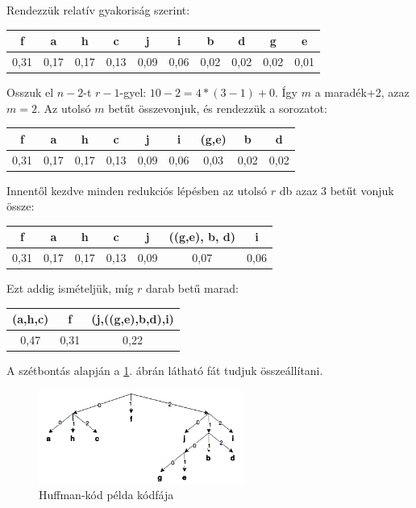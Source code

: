 \documentclass[margin=0px]{article}
\begin{document}
\begin{description}
					Rendezzük relatív gyakoriság szerint:
					
					\begin{tabular}{|c|c|c|c|c|c|c|c|c|c|}
						\hline f & a & h & c & j & i & b & d & g & e \\ 
						\hline 0,31 & 0,17 & 0,17 & 0,13 & 0,09 & 0,06 & 0,02 & 0,02 & 0,02 & 0,01 \\ 
						\hline 
					\end{tabular} 
					
					Osszuk el $n-2$-t $r-1$-gyel: $10-2 = 4*(3-1)+0$. Így $m$ a maradék+2, azaz $m=2$.
					Az utolsó $m$ betűt összevonjuk, és rendezzük a sorozatot:
					
					\begin{tabular}{|c|c|c|c|c|c|c|c|c|}
						\hline f & a & h & c & j & i & (g,e) & b & d  \\ 
						\hline 0,31 & 0,17 & 0,17 & 0,13 & 0,09 & 0,06 & 0,03 & 0,02 & 0,02 \\ 
						\hline 
					\end{tabular}
					
					Innentől kezdve minden redukciós lépésben az utolsó $r$ db azaz 3 betűt vonjuk össze:
					
					\begin{tabular}{|c|c|c|c|c|c|c|}
						\hline f & a & h & c & j & ((g,e), b, d) & i  \\ 
						\hline 0,31 & 0,17 & 0,17 & 0,13 & 0,09 & 0,07 & 0,06  \\ 
						\hline 
					\end{tabular}
					
					Ezt addig ismételjük, míg $r$ darab betű marad:
					
					\begin{tabular}{|c|c|c|}
						\hline (a,h,c) & f & (j,((g,e),b,d),i) \\ 
						\hline 0,47 & 0,31 & 0,22 \\ 
						\hline 
					\end{tabular} 
					
					A szétbontás alapján a \ref{fig:huffmann_split}. ábrán látható fát tudjuk összeállítani.
					
					\begin{figure}[H] 
						\centering
						\includegraphics[width=0.6\textwidth]{img/huffmann_split.png}
						\caption{Huffman-kód példa kódfája}
						\label{fig:huffmann_split}
					\end{figure}
					

\end{description}
\end{document}
